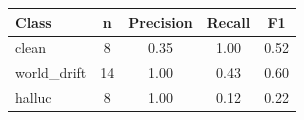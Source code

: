 \begin{tabular}{@{}l @{\hspace{1.8em}} S[table-format=2.0] @{\hspace{1.6em}} S @{\hspace{1.6em}} S @{\hspace{1.6em}} S @{}}
\toprule
\textbf{Class} & {\textbf{n}} & {\textbf{Precision}} & {\textbf{Recall}} & {\textbf{F1}} \\
\midrule
\textsf{clean} & 8 & 0.35 & 1.00 & 0.52 \\
\textsf{world\_drift} & 14 & 1.00 & 0.43 & 0.60 \\
\textsf{halluc} & 8 & 1.00 & 0.12 & 0.22 \\
\bottomrule
\end{tabular}
